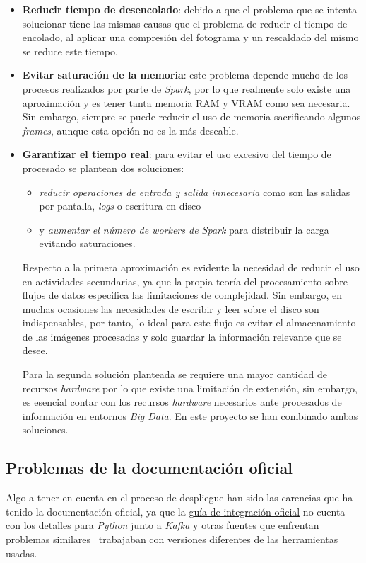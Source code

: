 \begin{itemize}
	\item \textbf{Reducir tiempo de desencolado}: debido a que el problema que se intenta solucionar tiene las mismas causas que el problema de reducir el tiempo de encolado, al aplicar una compresión del fotograma y un rescaldado del mismo se reduce este tiempo.
	\item \textbf{Evitar saturación de la memoria}: este problema depende mucho de los procesos realizados por parte de \textit{Spark}, por lo que realmente solo existe una aproximación y es tener tanta memoria RAM y VRAM como sea necesaria. Sin embargo, siempre se puede reducir el uso de memoria sacrificando algunos \textit{frames}, aunque esta opción no es la más deseable.
	\item \textbf{Garantizar el tiempo real}: para evitar el uso excesivo del tiempo de procesado se plantean dos soluciones:
	\begin{itemize}
		\item \textit{reducir operaciones de entrada y salida innecesaria} como son las salidas por pantalla, \textit{logs} o escritura en disco
		\item y \textit{aumentar el número de workers de Spark} para distribuir la carga evitando saturaciones.
	\end{itemize}
	Respecto a la primera aproximación es evidente la necesidad de reducir el uso en actividades secundarias, ya que la propia teoría del procesamiento sobre flujos de datos especifica las limitaciones de complejidad. Sin embargo, en muchas ocasiones las necesidades de escribir y leer sobre el disco son indispensables, por tanto, lo ideal para este flujo es evitar el almacenamiento de las imágenes procesadas y solo guardar la información relevante que se desee.
	
	Para la segunda solución planteada se requiere una mayor cantidad de recursos \textit{hardware} por lo que existe una limitación de extensión, sin embargo, es esencial contar con los recursos \textit{hardware} necesarios ante procesados de información en entornos \textit{Big Data}.
	En este proyecto se han combinado ambas soluciones.
\end{itemize}

\subsection{Problemas de la documentación oficial}

Algo a tener en cuenta en el proceso de despliegue han sido las carencias que ha tenido la documentación oficial, ya que la \href{https://spark.apache.org/docs/latest/streaming-kafka-integration.html}{guía de integración oficial} no cuenta con los detalles para \textit{Python} junto a \textit{Kafka} y otras fuentes que enfrentan problemas similares~\cite{amit2017kafka} trabajaban con versiones diferentes de las herramientas usadas.

